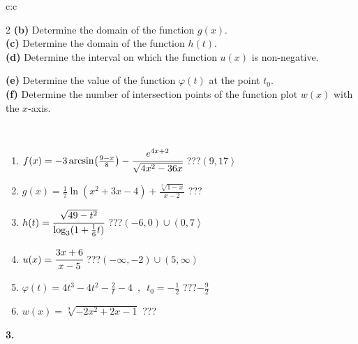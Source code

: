 \documentclass[10pt]{report}
\begin{document}
\begin{tabular}{c:c}
\begin{minipage}[c][104.5mm][t]{0.5\linewidth}
\begin{center}
\begin{minipage}{0.95\linewidth}
\begin{center}
{\begin{multicols}{2}
\textbf{(b)} Determine the domain of the function \(g(x)\). \\[1mm]
\textbf{(c)} Determine the domain of the function \(h(t)\). \\[1mm]
\textbf{(d)} Determine the interval on which the function \(u(x)\) is non-negative. \par \columnbreak
\textbf{(e)} Determine the value of the function \(\varphi(t)\) at the point \(t_0\). \\[1mm]
\textbf{(f)} Determine the number of intersection points of the function plot \(w(x)\) with the \(x\)-axis. \\[1mm]
\end{multicols}
}
\end{center}
\end{minipage}
\\[4mm]
\begin{minipage}{0.79\linewidth}
\begin{center}
\begin{varwidth}{\linewidth}
\begin{enumerate}
\small
\item $f(x) = -3\arcsin\!\left( \frac{9-x}{8} \right) - \cfrac{e^{4x+2}}{\sqrt{4x^2-36x}}$\quad \dotfill\; ???\;\dotfill \quad $\left(9 , 17\right\rangle$
\item $g(x) = \frac{1}{7} \ln{\!(x^2+3x-4)}+\frac{\sqrt[3]{1-x}}{x-2}$\quad \dotfill\; ???\;\dotfill {}
\item $h(t) = \cfrac{\sqrt{49-t^2}}{\log_3(1+\frac{1}{6}t)}$\quad \dotfill\; ???\;\dotfill \quad $\left(-6 , 0\right)\cup\left(0 , 7\right\rangle$
\item $u(x) = \cfrac{3x+6}{x-5}$\quad \dotfill\; ???\;\dotfill \quad $\left(-\infty , -2\right)\cup\left(5 , \infty\right)$
\item $\varphi(t) = 4t^3-4t^2-\frac{2}{t}-4 \enspace , \enspace t_0=-\frac{1}{2}$\quad \dotfill\; ???\;\dotfill \quad $-\frac{9}{2}$
\item $w(x) = \sqrt[9]{-2x^2+2x-1}$\quad \dotfill\; ???\;\dotfill {}
\end{enumerate}
\end{varwidth}
\end{center}
\end{minipage}
\begin{minipage}{0.20\linewidth}
\begin{center}
{\Huge\bfseries 3.} \\[2mm]

\end{center}
\end{minipage}
\end{center}
\end{minipage}
\end{tabular}
\end{document}
